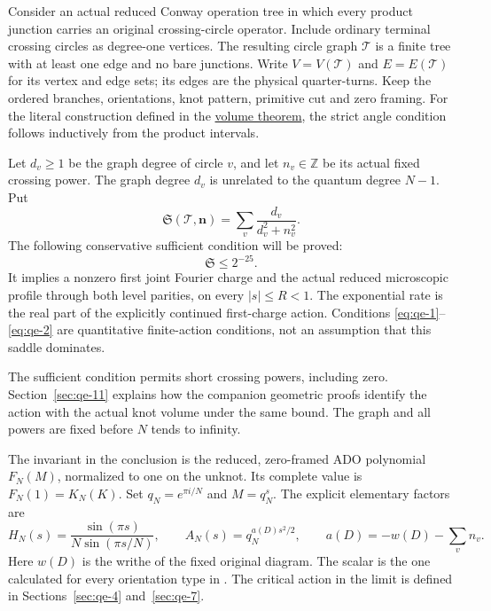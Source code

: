 Consider an actual reduced Conway operation tree in which every product junction carries an original crossing-circle operator. Include ordinary terminal crossing circles as degree-one vertices. The resulting circle graph \(\mathcal T\) is a finite tree with at least
one edge and no bare junctions. Write \(V=V(\mathcal T)\) and
\(E=E(\mathcal T)\) for its vertex and edge sets; its edges are the
physical quarter-turns. Keep the ordered branches, orientations, knot pattern, primitive cut and zero framing. For the literal construction defined in the \hyperref[ch:quantitative-circle-trees]{volume theorem}, the strict angle condition follows inductively from the product intervals.

Let \(d_v\ge1\) be the graph degree of circle \(v\), and let \(n_v\in
\mathbb Z\) be its actual fixed crossing power. The graph degree \(d_v\) is unrelated to the quantum degree \(N-1\). Put
\begin{equation}
\mathfrak S(\mathcal T,\mathbf n)
       =\sum_v\frac{d_v}{d_v^2+n_v^2}.
\label{eq:qe-1}
\end{equation}
The following conservative sufficient condition will be proved:
\begin{equation}
\mathfrak S\le2^{-25}.
\label{eq:qe-2}
\end{equation}
It implies a nonzero first joint Fourier charge and the actual reduced microscopic profile through both level parities, on every \(|s|\le R<1\). The exponential rate is the real part of the explicitly continued first-charge action. Conditions \eqref{eq:qe-1}--\eqref{eq:qe-2} are quantitative finite-action conditions, not an assumption that this saddle dominates.

The sufficient condition permits short crossing powers, including zero. Section~\ref{sec:qe-11} explains how the companion geometric proofs identify the action with the actual knot volume under the same bound. The graph and all powers are fixed before \(N\) tends to infinity.

The invariant in the conclusion is the reduced, zero-framed ADO polynomial \(F_N(M)\), normalized to one on the unknot. Its complete value is \(F_N(1)=K_N(K)\). Set \(q_N=e^{\pi i/N}\) and \(M=q_N^s\). The explicit elementary factors are
\[
H_N(s)=\frac{\sin(\pi s)}{N\sin(\pi s/N)},\qquad
A_N(s)=q_N^{a(D)s^2/2},\qquad a(D)=-w(D)-\sum_v n_v.
\]
Here \(w(D)\) is the writhe of the fixed original diagram. The scalar is the one calculated for every orientation type in
\cite[Proposition~8.1]{MeridianTangles}. The critical action in the limit is defined in Sections~\ref{sec:qe-4} and~\ref{sec:qe-7}.

